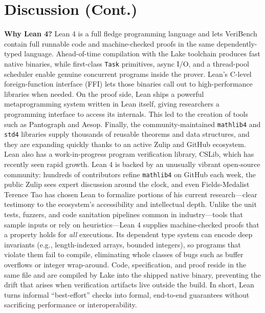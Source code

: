 \documentclass{article}
\begin{document}
\section{Discussion (Cont.)}
\textbf{Why Lean 4?}
Lean 4 is a full fledge programming language and lets VeriBench contain full runnable code and machine-checked proofs in the same dependently-typed language.
Ahead-of-time compilation with the Lake toolchain produces fast native binaries, while first-class \texttt{Task} primitives, async I/O, and a thread-pool scheduler enable genuine concurrent programs inside the prover.
Lean's C-level foreign-function interface (FFI) lets those binaries call out to high-performance libraries when needed.
On the proof side, Lean ships a powerful metaprogramming system written in Lean itself, giving researchers a programming interface to access its internals. This led to the creation of tools such as Pantograph and Aesop.
Finally, the community-maintained \texttt{mathlib4} and \texttt{std4} libraries supply thousands of reusable theorems and data structures, and they are expanding quickly thanks to an active Zulip and GitHub ecosystem. Lean also has a work-in-progress program verification library, CSLib, which has recently seen rapid growth.
Lean 4 is backed by an unusually vibrant open-source community: hundreds of contributors refine \texttt{mathlib4} on GitHub each week, the public Zulip sees expert discussion around the clock, and even Fields-Medalist Terence Tao has chosen Lean to formalize portions of his current research---clear testimony to the ecosystem's accessibility and intellectual depth.
Unlike the unit tests, fuzzers, and code sanitation pipelines common in industry---tools that sample inputs or rely on heuristics---Lean 4 supplies machine-checked proofs that a property holds for \emph{all} executions.
Its dependent type system can encode deep invariants (e.g., length-indexed arrays, bounded integers), so programs that violate them fail to compile, eliminating whole classes of bugs such as buffer overflows or integer wrap-around.
Code, specification, and proof reside in the same file and are compiled by Lake into the shipped native binary, preventing the drift that arises when verification artifacts live outside the build.
In short, Lean turns informal ``best-effort'' checks into formal, end-to-end guarantees without sacrificing performance or interoperability.
\end{document}
